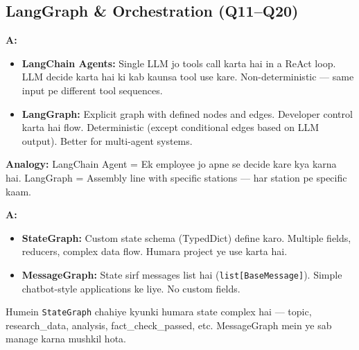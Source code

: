 \documentclass[12pt, a4paper]{article}
\begin{document}
\subsection{LangGraph \& Orchestration (Q11--Q20)}

\begin{interviewbox}[title={\faIcon{user-tie} ~Q11: LangGraph vs LangChain Agents --- kya fark hai?}]
\textbf{A:}
\begin{itemize}
\item \textbf{LangChain Agents:} Single LLM jo tools call karta hai in a ReAct loop. LLM decide karta hai ki kab kaunsa tool use kare. Non-deterministic --- same input pe different tool sequences.
\item \textbf{LangGraph:} Explicit graph with defined nodes and edges. Developer control karta hai flow. Deterministic (except conditional edges based on LLM output). Better for multi-agent systems.
\end{itemize}

\textbf{Analogy:} LangChain Agent = Ek employee jo apne se decide kare kya karna hai. LangGraph = Assembly line with specific stations --- har station pe specific kaam.
\end{interviewbox}

\begin{interviewbox}[title={\faIcon{user-tie} ~Q12: \texttt{StateGraph} vs \texttt{MessageGraph} --- kab kya use karein?}]
\textbf{A:}
\begin{itemize}
\item \textbf{StateGraph:} Custom state schema (TypedDict) define karo. Multiple fields, reducers, complex data flow. Humara project ye use karta hai.
\item \textbf{MessageGraph:} State sirf messages list hai (\texttt{list[BaseMessage]}). Simple chatbot-style applications ke liye. No custom fields.
\end{itemize}

Humein \texttt{StateGraph} chahiye kyunki humara state complex hai --- topic, research\_data, analysis, fact\_check\_passed, etc. MessageGraph mein ye sab manage karna mushkil hota.
\end{interviewbox}
\end{document}
